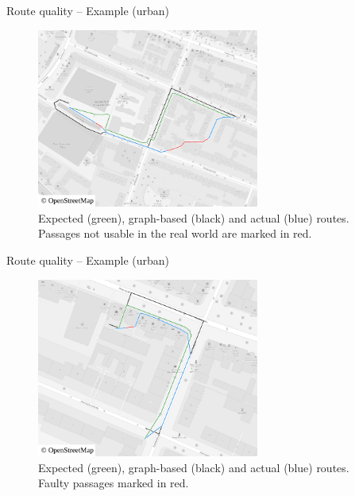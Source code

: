 \documentclass[xcolor={x11names}]{beamer}
\newenvironment{figcenter}
{%
	\parskip=0pt%
	\par%
	\nopagebreak%
	\centering%
}%
{%
	\par%
	\noindent%
	\ignorespacesafterend%
}
\begin{document}
		\begin{frame}{Route quality -- Example (urban)}
			\begin{figure}
				\begin{figcenter}
					\includegraphics[width=0.65\textwidth]{../thesis/images/qgis-routing-city-routing-6.pdf}
				\end{figcenter}
				\caption{Expected (green), graph-based (black) and actual (blue) routes. Passages not usable in the real world are marked in red.}
			\end{figure}
		\end{frame}
		
		\begin{frame}{Route quality -- Example (urban)}
			\begin{figure}
				\begin{figcenter}
					\includegraphics[width=0.65\textwidth]{../thesis/images/qgis-routing-city-routing-1.pdf}
				\end{figcenter}
				\caption{Expected (green), graph-based (black) and actual (blue) routes. Faulty passages marked in red.}
			\end{figure}
		\end{frame}
		
\end{document}
